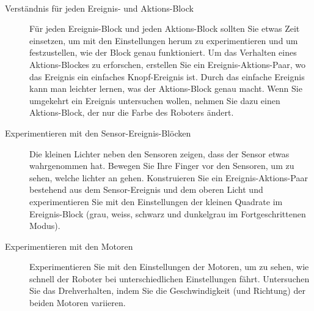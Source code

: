 \label{a.tips}

\
\begin{description}

\item[Verständnis für jeden Ereignis- und Aktions-Block] Für jeden Ereignis-Block und jeden Aktions-Block sollten Sie etwas Zeit einsetzen, um mit den Einstellungen herum zu experimentieren und um festzustellen, wie der Block genau funktioniert. Um das Verhalten eines Aktions-Blockes zu erforschen, erstellen Sie ein Ereignis-Aktions-Paar, wo das Ereignis ein einfaches Knopf-Ereignis ist. Durch das einfache Ereignis kann man leichter lernen, was der Aktions-Block genau macht. Wenn Sie umgekehrt ein Ereignis untersuchen wollen, nehmen Sie dazu einen Aktions-Block, der nur die Farbe des Roboters ändert.

\item[Experimentieren mit den Sensor-Ereignis-Blöcken] Die kleinen Lichter neben den Sensoren zeigen, dass der Sensor etwas wahrgenommen hat. Bewegen Sie Ihre Finger vor den Sensoren, um zu sehen, welche lichter an gehen. Konstruieren Sie ein Ereignis-Aktions-Paar bestehend aus dem Sensor-Ereignis und dem oberen Licht und experimentieren Sie mit den Einstellungen der kleinen Quadrate im Ereignis-Block (grau, weiss, schwarz und dunkelgrau im Fortgeschrittenen Modus).

\item[Experimentieren mit den Motoren] Experimentieren Sie mit den Einstellungen der Motoren, um zu sehen, wie schnell der Roboter bei unterschiedlichen Einstellungen fährt. Untersuchen Sie das Drehverhalten, indem Sie die Geschwindigkeit (und Richtung) der beiden Motoren variieren.

\end{description}



